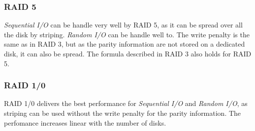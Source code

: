 \documentclass{article}
\begin{document}
\subsubsection*{RAID 5}
	\emph{Sequential I/O} can be handle very well by RAID 5,
	as it can be spread over all the disk by striping.
	\emph{Random I/O} can be handle well to.
	The write penalty is the same as in RAID 3,
	but as the parity information are not stored on a dedicated disk,
	it can also be spread.
	The formula described in RAID 3 also holds for RAID 5.

\subsubsection*{RAID 1/0}
	RAID 1/0 delivers the best performance for \emph{Sequential I/O} and 
	\emph{Random I/O}, as striping can be used without the write penalty
	for the parity information.
	The perfomance increases linear with the number of disks.
\end{document}
